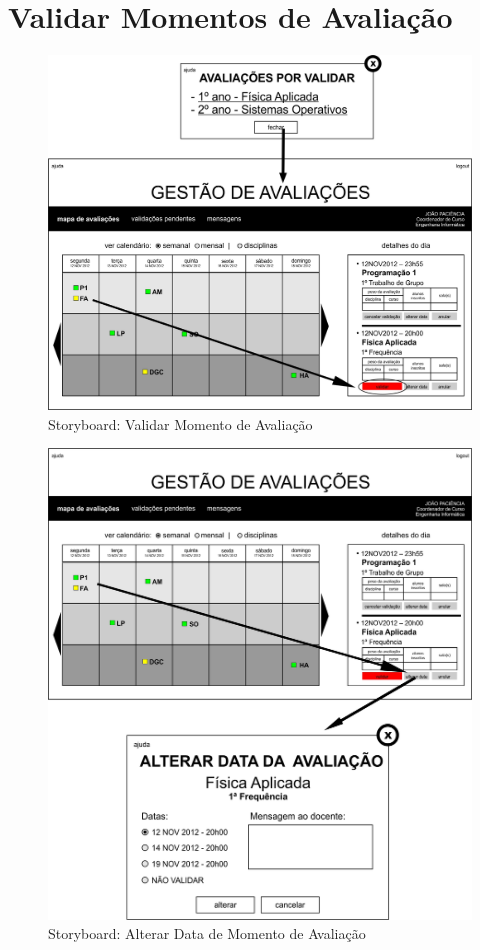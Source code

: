 \clearpage
\section{Validar Momentos de Avaliação}

\begin{figure}[!htbp]
\centering
\includegraphics{imagens/validar_momento_de_avaliacao_i.jpg}
\caption{Storyboard: Validar Momento de Avaliação}
\label{fig:validar_momento_de_avaliacao_i}
\end{figure}

\begin{figure}[!htbp]
\centering
\includegraphics{imagens/alterar_data_de_momento_de_avaliacao_i.jpg}
\caption{Storyboard: Alterar Data de Momento de Avaliação}
\label{fig:alterar_data_de_momento_de_avaliacao_i}
\end{figure}

